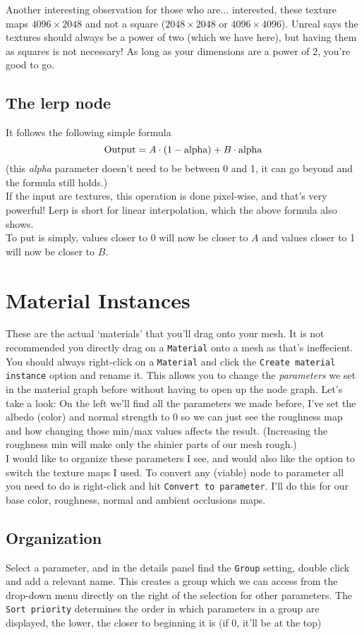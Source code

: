 \documentclass{article}
\begin{document}
Another interesting observation for those who are... interested, these texture maps $4096\times2048$ and not a square ($2048\times2048$ or $4096\times4096$). Unreal says the textures should always be a power of two (which we have here), but having them as squares is not necessary! As long as your dimensions are a power of 2, you're good to go.
\newpage
\subsection{The lerp node}

It follows the following simple formula
\[
\textup{Output}=A\cdot(1-\textup{alpha})+B\cdot \textup{alpha}
\]
(this \emph{alpha} parameter doesn't need to be between 0 and 1, it can go beyond and the formula still holds.)\\
If the input are textures, this operation is done pixel-wise, and that's very powerful! Lerp is short for linear interpolation, which the above formula also shows.
\\[10pt]
To put is simply, values closer to 0 will now be closer to $A$ and values closer to 1 will now be closer to $B$.


\section{Material Instances}
These are the actual `materials' that you'll drag onto your mesh. It is not recommended you directly drag on a \verb|Material| onto a mesh as that's ineffecient. You should always right-click on a \verb|Material| and click the \verb|Create material instance| option and rename it. This allows you to change the \emph{parameters} we set in the material graph before without having to open up the node graph. Let's take a look:
\newpage
On the left we'll find all the parameters we made before, I've set the albedo (color) and normal strength to 0 so we can just see the roughness map and how changing those min/max values affects the result. (Increasing the roughness min will make only the shinier parts of our mesh rough.)
\\[10pt]
I would like to organize these parameters I see, and would also like the option to switch the texture maps I used. To convert any (viable) node to parameter all you need to do is right-click and hit \verb|Convert to parameter|. I'll do this for our base color, roughness, normal and ambient occlusions maps.

\subsection{Organization}
Select a parameter, and in the details panel find the \verb|Group| setting, double click and add a relevant name. This creates a group which we can access from the drop-down menu directly on the right of the selection for other parameters. The \verb|Sort priority| determines the order in which parameters in a group are displayed, the lower, the closer to beginning it is (if 0, it'll be at the top)
\end{document}
